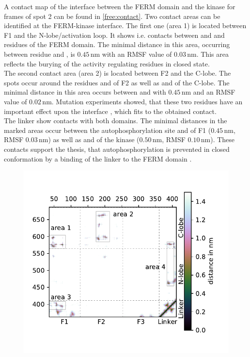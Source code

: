 %
%
%
A contact map of the interface between the FERM domain and the kinase for frames of spot 2 can be found in \autoref{free:contact}. Two contact areas can be identified at the FERM-kinase interface. The first one (area 1) is located between F1 and the N-lobe/activation loop. It shows i.e. contacts between  and  and residues of the FERM domain. The minimal distance in this area, occurring between residue  and , is $0.45\,\si{\nano\metre}$ with an RMSF value of $0.03\,\si{\nano\metre}$. This area reflects the burying of the activity regulating residues in closed state.\\
The second contact area (area 2) is located between F2 and the C-lobe. The spots occur around the residues  and  of F2 as well as  and  of the C-lobe. The minimal distance in this area occurs between  and  with $0.45\,\si{\nano\metre}$ and an RMSF value of $0.02\,\si{\nano\metre}$. Mutation experiments showed, that these two residues have an important effect upon the interface \autocite{structFAK}, which fits to the obtained contact.\\
The linker show contacts with both domains. The minimal distances in the marked areas occur between the autophosphorylation site  and  of F1 ($0.45\,\si{\nano\metre}$, RMSF $0.03\,\si{\nano\metre}$) as well as  and  of the kinase ($0.50\,\si{\nano\metre}$, RMSF $0.10\,\si{\nano\metre}$). These contacts support the thesis, that autophosphorylation is prevented in closed conformation by a binding of the linker to the FERM domain \autocite{pap003}.\\
%
%
%
\begin{figure}
	\centering
	\includegraphics[width=.7\textwidth]{figures/results/contactmap_free}
	\label{free:contact}
\end{figure}
%
%
%
